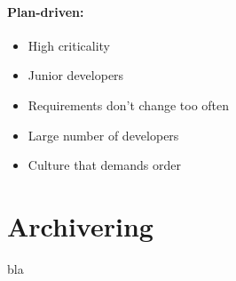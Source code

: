\documentclass[12pt, a4paper]{article}
\begin{document}
\paragraph{Plan-driven:}
\begin{itemize}
  \item High criticality
  \item Junior developers
  \item Requirements don't change too often
  \item Large number of developers
  \item Culture that demands order
\end{itemize}



\section{Archivering}

bla




\end{document}
